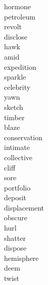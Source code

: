 \documentclass[a4paper, 11pt]{ctexart}
\begin{document}
\begin{multicols*}{3}
\begin{description}
\item[hormone]

\item[petroleum]

\item[revolt]

\item[disclose]

\item[hawk]

\item[amid]

\item[expedition]

\item[sparkle]

\item[celebrity]

\item[yawn]

\item[sketch]

\item[timber]

\item[blaze]

\item[conservation]

\item[intimate]

\item[collective]

\item[cliff]

\item[sore]

\item[portfolio]

\item[deposit]

\item[displacement]

\item[obscure]

\item[hurl]

\item[shatter]

\item[dispose]

\item[hemisphere]

\item[deem]

\item[twist]


\end{description}
\end{multicols*}
\end{document}
